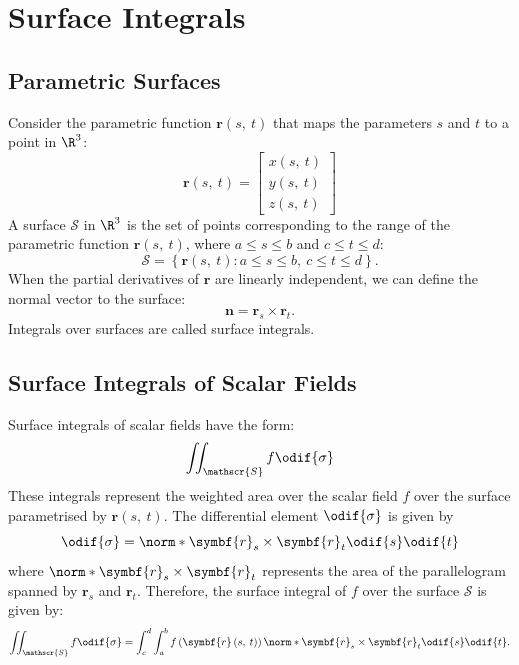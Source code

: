 \documentclass{article}
\begin{document}
\section{Surface Integrals}
\subsection{Parametric Surfaces}
Consider the parametric function \(\symbf{r}\left( s,\: t \right)\)
that maps the parameters \(s\) and \(t\) to a point in \(\R^3\):
\begin{equation*}
    \symbf{r}\left( s,\: t \right) =
    \begin{bmatrix}
        x\left( s,\: t \right) \\
        y\left( s,\: t \right) \\
        z\left( s,\: t \right)
    \end{bmatrix}
\end{equation*}
A surface \(\mathscr{S}\) in \(\R^3\) is the set of points corresponding
to the range of the parametric function \(\symbf{r}\left( s,\: t \right)\),
where \(a \leqslant s \leqslant b\) and \(c \leqslant t \leqslant d\):
\begin{equation*}
    \mathscr{S} = \left\{ \symbf{r}\left( s,\: t \right) : a \leqslant s \leqslant b, \: c \leqslant t \leqslant d \right\}.
\end{equation*}
When the partial derivatives of \(\symbf{r}\) are linearly independent,
we can define the normal vector to the surface:
\begin{equation*}
    \symbf{n} = \symbf{r}_s \times \symbf{r}_t.
\end{equation*}
Integrals over surfaces are called surface integrals.
\subsection{Surface Integrals of Scalar Fields}
Surface integrals of scalar fields have the form:
\begin{equation*}
    \iint_{\mathscr{S}} f \odif{\sigma}
\end{equation*}
These integrals represent the weighted area over the scalar field \(f\)
over the surface parametrised by \(\symbf{r}\left( s,\: t \right)\).
The differential element \(\odif{\sigma}\) is given by
\begin{equation*}
    \odif{\sigma} = \norm*{\symbf{r}_s \times \symbf{r}_t} \odif{s} \odif{t}
\end{equation*}
where \(\norm*{\symbf{r}_s \times \symbf{r}_t}\) represents the area of
the parallelogram spanned by \(\symbf{r}_s\) and \(\symbf{r}_t\).
Therefore, the surface integral of \(f\) over the surface \(\mathscr{S}\)
is given by:
\begin{equation*}
    \iint_{\mathscr{S}} f \odif{\sigma} = \int_c^d \int_a^b f\left( \symbf{r}\left( s,\: t \right) \right) \norm*{\symbf{r}_s \times \symbf{r}_t} \odif{s} \odif{t}.
\end{equation*}
\end{document}
